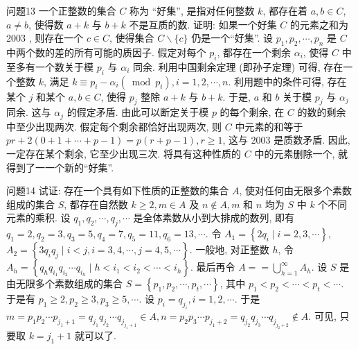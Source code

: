 问题13 一个正整数的集合 $C$ 称为 “好集”, 是指对任何整数 $k$, 都存在着 $a, b \in C$, $a \neq b$, 使得数 $a+k$ 与 $b+k$ 不是互质的数.
证明: 如果一个好集 $C$ 的元素之和为 2003 , 则存在一个 $c \in C$, 使得集合 $C \backslash\{c\}$ 仍是一个“好集”.
设 $p_1, p_2, \cdots, p_n$ 是 $C$ 中两个数的差的所有可能的质因子.
假定对每个 $p_i$, 都存在一个剩余 $\alpha_i$, 使得 $C$ 中至多有一个数关于模 $p_i$ 与 $\alpha_i$ 同余.
利用中国剩余定理 (即孙子定理) 可得, 存在一个整数 $k$, 满足 $k \equiv p_i-\alpha_i(\bmod p_i ), i=1,2, \cdots, n$. 利用题中的条件可得, 存在某个 $j$ 和某个 $a, b \in C$, 使得 $p_j$ 整除 $a+k$ 与 $b+k$. 于是, $a$ 和 $b$ 关于模 $p_j$ 与 $\alpha_j$ 同余.
这与 $\alpha_j$ 的假定矛盾.
由此可以断定关于模 $p$ 的每个剩余, 在 $C$ 的数的剩余中至少出现两次.
假定每个剩余都恰好出现两次, 则 $C$ 中元素的和等于 $p r+2(0+1+\cdots+ p-1)=p(r+p-1), r \geqslant 1$, 这与 2003 是质数矛盾.
因此, 一定存在某个剩余, 它至少出现三次.
将具有这种性质的 $C$ 中的元素删除一个, 就得到了一一个新的“好集”.



问题14 试证: 存在一个具有如下性质的正整数的集合 $A$, 使对任何由无限多个素数组成的集合 $S$, 都存在自然数 $k \geqslant 2, m \in A$ 及 $n \notin A, m$ 和 $n$ 均为 $S$ 中 $k$ 个不同元素的乘积.
设 $q_1, q_2, \cdots, q_j, \cdots$ 是全体素数从小到大排成的数列, 即有 $q_1=2, q_2=3, q_3=5, q_4=7, q_5=11, q_6=13, \cdots$. 令 $A_1=\left\{2 q_i \mid i=2,3, \cdots\right\}$, $A_2=\left\{3 q_i q_j \mid i<j, i=3,4, \cdots, j=4,5, \cdots\right\}$. 一般地, 对正整数 $h$, 令 $A_h=\left\{q_h q_{i_1} q_{i_2} \cdots q_{i_h} \mid h<i_1<i_2<\cdots<i_h\right\}$. 最后再令 $A==\bigcup_{h=1}^{\infty} A_h$.
设 $S$ 是由无限多个素数组成的集合 $S=\left\{p_1, p_2, \cdots, p_t, \cdots\right\}$, 其中 $p_1<p_2<\cdots<p_t<\cdots$. 于是有 $p_1 \geqslant 2, p_2 \geqslant 3, p_3 \geqslant 5, \cdots$. 设 $p_i=q_{j_i}, i=1,2, \cdots$. 于是 $m=p_1 p_2 \cdots p_{j_1+1}=q_{j_1} q_{j_2} \cdots q_{j_{j_1+1}} \in A, n=p_2 p_3 \cdots p_{j_1+2}= q_{j_2} q_{j_3} \cdots q_{j_{j_2+2}} \notin A$. 可见, 只要取 $k=j_1+1$ 就可以了.



